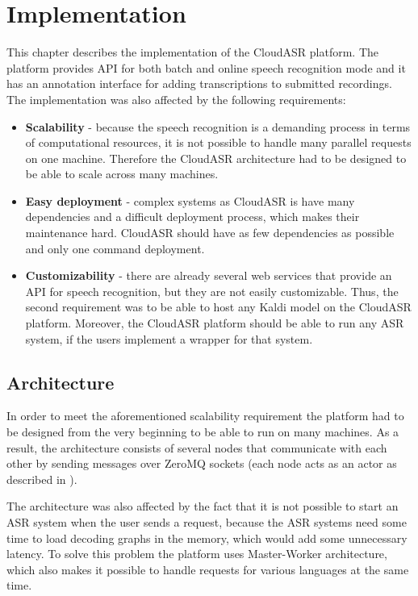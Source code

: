 \chapter{Implementation}
This chapter describes the implementation of the CloudASR platform.
The platform provides API for both batch and online speech recognition mode
  and it has an annotation interface for adding transcriptions to submitted recordings.
The implementation was also affected by the following requirements:

\begin{itemize}
  \item
    \textbf{Scalability} -
      because the speech recognition is a demanding process in terms of computational resources,
        it is not possible to handle many parallel requests on one machine.
      Therefore the CloudASR architecture had to be designed to be able to scale across many machines.

  \item
    \textbf{Easy deployment} -
      complex systems as CloudASR is have many dependencies and a difficult deployment process,
        which makes their maintenance hard.
      CloudASR should have as few dependencies as possible and only one command deployment.

  \item
    \textbf{Customizability} -
       there are already several web services that provide an API for speech recognition,
         but they are not easily customizable.
       Thus, the second requirement was to be able to host any Kaldi model on  the CloudASR platform.
       Moreover, the CloudASR platform should be able to run any ASR system,
         if the users implement a wrapper for that system.

\end{itemize}


\section{Architecture}
In order to meet the aforementioned scalability requirement
  the platform had to be designed from the very beginning to be able to run on many machines.
As a result, the architecture consists of several nodes
  that communicate with each other by sending messages over ZeroMQ sockets
  (each node acts as an actor as described in \cite{hewitt1977viewing}).

The architecture was also affected by the fact
  that it is not possible to start an ASR system when the user sends a request,
  because the ASR systems need some time to load decoding graphs in the memory,
  which would add some unnecessary latency.
To solve this problem the platform uses Master-Worker architecture,
  which also makes it possible to handle requests for various languages at the same time.

